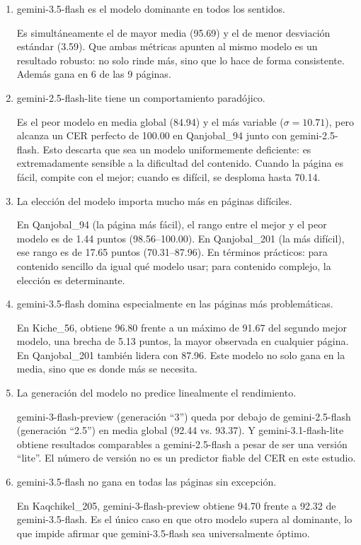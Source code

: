 \begin{enumerate}
    \item gemini-3.5-flash es el modelo dominante en todos los sentidos.

    Es simultáneamente el de mayor media (95.69) y el de menor desviación estándar (3.59). Que ambas métricas apunten al mismo modelo es un resultado robusto: no solo rinde más, sino que lo hace de forma consistente. Además gana en 6 de las 9 páginas.

    \item gemini-2.5-flash-lite tiene un comportamiento paradójico.

    Es el peor modelo en media global (84.94) y el más variable (\(\sigma=10.71\)), pero alcanza un CER perfecto de 100.00 en Qanjobal\_94 junto con gemini-2.5-flash. Esto descarta que sea un modelo uniformemente deficiente: es extremadamente sensible a la dificultad del contenido. Cuando la página es fácil, compite con el mejor; cuando es difícil, se desploma hasta 70.14.

    \item La elección del modelo importa mucho más en páginas difíciles.

    En Qanjobal\_94 (la página más fácil), el rango entre el mejor y el peor modelo es de 1.44 puntos (98.56--100.00). En Qanjobal\_201 (la más difícil), ese rango es de 17.65 puntos (70.31--87.96). En términos prácticos: para contenido sencillo da igual qué modelo usar; para contenido complejo, la elección es determinante.

    \item gemini-3.5-flash domina especialmente en las páginas más problemáticas.

    En Kiche\_56, obtiene 96.80 frente a un máximo de 91.67 del segundo mejor modelo, una brecha de 5.13 puntos, la mayor observada en cualquier página. En Qanjobal\_201 también lidera con 87.96. Este modelo no solo gana en la media, sino que es donde más se necesita.

    \item La generación del modelo no predice linealmente el rendimiento.

    gemini-3-flash-preview (generación ``3'') queda por debajo de gemini-2.5-flash (generación ``2.5'') en media global (92.44 vs. 93.37). Y gemini-3.1-flash-lite obtiene resultados comparables a gemini-2.5-flash a pesar de ser una versión ``lite''. El número de versión no es un predictor fiable del CER en este estudio.

    \item gemini-3.5-flash no gana en todas las páginas sin excepción.

    En Kaqchikel\_205, gemini-3-flash-preview obtiene 94.70 frente a 92.32 de gemini-3.5-flash. Es el único caso en que otro modelo supera al dominante, lo que impide afirmar que gemini-3.5-flash sea universalmente óptimo.
\end{enumerate}

